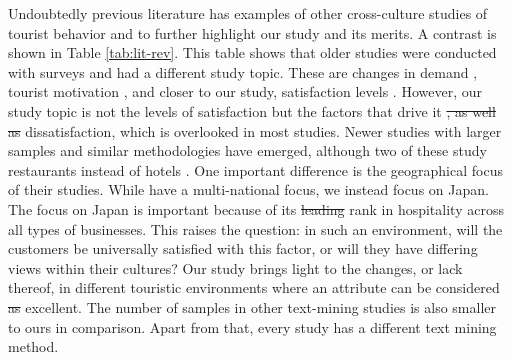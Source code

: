 \documentclass[smallextended,natbib]{svjour3}       %
\providecommand{\DIFadd}[1]{{\protect\color{blue}\uwave{#1}}} %
\providecommand{\DIFdel}[1]{{\protect\color{red}\sout{#1}}}                      %
\providecommand{\DIFaddbegin}{} %
\providecommand{\DIFaddend}{} %
\providecommand{\DIFdelbegin}{} %
\providecommand{\DIFdelend}{} %
\begin{document}
    Undoubtedly previous literature has examples of other cross-culture studies of tourist behavior and to further highlight our study and its merits. A contrast is shown in Table \ref{tab:lit-rev}. This table shows that older studies were conducted with surveys and had a different study topic. These are changes in demand \DIFdelbegin %
\DIFdelend \DIFaddbegin \cite[][]{bauer1993changing}\DIFaddend , tourist motivation \DIFdelbegin %
\DIFdelend \DIFaddbegin \cite[][]{kim2000}\DIFaddend , and closer to our study, satisfaction levels \DIFdelbegin %
\DIFdelend \DIFaddbegin \cite[][]{choi2000}\DIFaddend . However, our study topic is not the levels of satisfaction but the factors that drive it \DIFdelbegin \DIFdel{, as well as }\DIFdelend \DIFaddbegin \DIFadd{and }\DIFaddend dissatisfaction, which is overlooked in most studies. Newer studies with larger samples and similar methodologies have emerged, although two of these study restaurants instead of hotels \DIFdelbegin %
\DIFdelend \DIFaddbegin \cite[][]{JIA2020104071, HUANG2017117}\DIFaddend . One important difference is the geographical focus of their studies. While \DIFdelbegin %
\DIFdelend \DIFaddbegin \cite{FRANCESCO201924} \DIFadd{, }\cite{JIA2020104071} \DIFadd{and }\cite{HUANG2017117} \DIFaddend have a multi-national focus, we instead focus on Japan. The focus on Japan is important because of its \DIFdelbegin \DIFdel{leading }\DIFdelend \DIFaddbegin \DIFadd{top }\DIFaddend rank in hospitality across all types of businesses. This raises the question: in such an environment, will the customers be universally satisfied with this factor, or will they have differing views within their cultures? Our study brings light to the changes, or lack thereof, in different touristic environments where an attribute can be considered \DIFdelbegin \DIFdel{as }\DIFdelend excellent. The number of samples in other text-mining studies is also smaller to ours in comparison. Apart from that, every study has a different text mining method.
\end{document}
